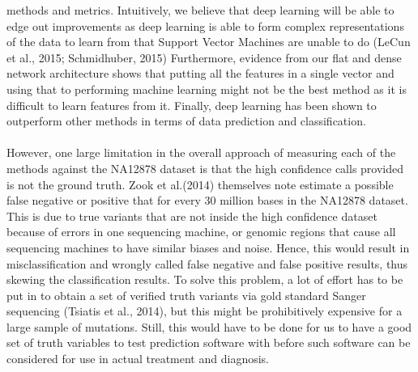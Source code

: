 \documentclass{article}
\begin{document}
methods and metrics. Intuitively, we believe that deep learning will be able to edge out improvements as deep learning is able to form complex representations of the data to learn from that Support Vector Machines are unable to do (LeCun et al., 2015; Schmidhuber, 2015) Furthermore, evidence from our flat and dense network architecture shows that putting all the features in a single vector and using that to performing machine learning might not be the best method as it is difficult to learn features from it. Finally, deep learning has been shown to outperform other methods in terms of data prediction and classification. \\\\

However, one large limitation in the overall approach of measuring each of the methods against the NA12878 dataset is that the high confidence calls provided is not the ground truth. Zook et al.(2014) themselves note estimate a possible false negative or positive that for every 30 million bases in the NA12878 dataset. This is due to true variants that are not inside the high confidence dataset because of errors in one sequencing machine, or genomic regions that cause all sequencing machines to have similar biases and noise. Hence, this would result in misclassification and wrongly called false negative and false positive results, thus skewing the classification results. To solve this problem, a lot of effort has to be put in to obtain a set of verified truth variants via gold standard Sanger sequencing (Tsiatis et al., 2014), but this might be prohibitively expensive for a large sample of mutations. Still, this would have to be done for us to have a good set of truth variables to test prediction software with before such software can be considered for use in actual treatment and diagnosis. \\\\
\end{document}
